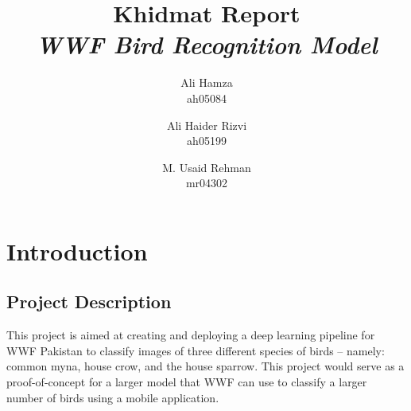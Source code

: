 \documentclass{article}
\title{\Huge Khidmat Report\\
\textit{WWF Bird Recognition Model}}
\author{Ali Hamza\\ ah05084
  \and
  Ali Haider Rizvi\\ ah05199
  \and
  M. Usaid Rehman\\ mr04302
}
\date{}
\begin{document}
\maketitle
\begin{center}
    
\begin{figure}[h!]
    \centering
    \qquad
    \label{fig:example}%
\end{figure}
\end{center}

\newpage
\tableofcontents
\newpage
\section{Introduction}
\subsection{Project Description}
\setlength{\parindent}{3em}
This project is aimed at creating and deploying a deep learning pipeline for WWF Pakistan to classify images of 
three different species of birds -- namely: common myna, house crow, and the house sparrow. This project 
would serve as a proof-of-concept for a larger model that WWF can use to classify a larger number of birds 
using a mobile application.
\end{document}
